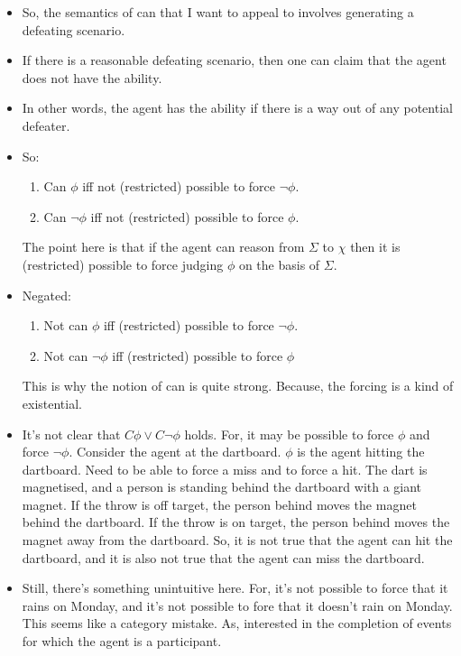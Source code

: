 \documentclass[10pt]{article}
\begin{document}
\begin{itemize}
\item So, the semantics of can that I want to appeal to involves generating a defeating scenario.
\item If there is a reasonable defeating scenario, then one can claim that the agent does not have the ability.
\item In other words, the agent has the ability if there is a way out of any potential defeater.
\item So:
  \begin{enumerate}
  \item Can \(\phi\) iff not (restricted) possible to force \(\lnot\phi\).
  \item Can \(\lnot\phi\) iff not (restricted) possible to force \(\phi\).
  \end{enumerate}
  The point here is that if the agent can reason from \(\Sigma\) to \(\chi\) then it is (restricted) possible to force judging \(\phi\) on the basis of \(\Sigma\).
\item Negated:
  \begin{enumerate}
  \item Not can \(\phi\) iff (restricted) possible to force \(\lnot\phi\).
  \item Not can \(\lnot\phi\) iff (restricted) possible to force \(\phi\)
  \end{enumerate}
  This is why the notion of can is quite strong.
  Because, the forcing is a kind of existential.
\item It's not clear that \(C\phi \lor C\lnot\phi\) holds.
  For, it may be possible to force \(\phi\) and force \(\lnot\phi\).
  Consider the agent at the dartboard.
  \(\phi\) is the agent hitting the dartboard.
  Need to be able to force a miss and to force a hit.
  The dart is magnetised, and a person is standing behind the dartboard with a giant magnet.
  If the throw is off target, the person behind moves the magnet behind the dartboard.
  If the throw is on target, the person behind moves the magnet away from the dartboard.
  So, it is not true that the agent can hit the dartboard, and it is also not true that the agent can miss the dartboard.
\item Still, there's something unintuitive here.
  For, it's not possible to force that it rains on Monday, and it's not possible to fore that it doesn't rain on Monday.
  This seems like a category mistake.
  As, interested in the completion of events for which the agent is a participant.
\end{itemize}
\end{document}
